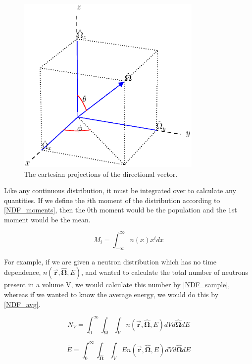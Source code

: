 \begin{figure}[h!] 
  \label{ang_relations}
  \centering
    \includegraphics[width=0.8\textwidth , trim= 0cm 2.5cm 0cm 0cm]{graphics/ang_relation.eps} %
     \caption{The cartesian projections of the directional vector.}
\end{figure}

Like any continuous distribution, it must be integrated over to calculate any quantities.  If we define the $i$th moment of the distribution according to \eqref{NDF_moments}, then the $0$th moment would be the population and the $1$st moment would be the mean.

\begin{equation}
\label{NDF_moments}
M_i = \int_{-\infty}^{\infty} n(x)  x^{i} dx
\end{equation}

For example, if we are given a neutron distribution which has no time dependence, $n(\boldsymbol{\vec{r}},\boldsymbol{\hat{\Omega}},E)$, and wanted to calculate the total number of neutrons present in a volume V, we would calculate this number by \eqref{NDF_sample}, whereas if we wanted to know the average energy, we would do this by \eqref{NDF_avg}.

\begin{equation}
\label{NDF_sample}
N_V = \int_0^\infty \int_{\boldsymbol{\hat{\Omega}}} \int_{V} n(\boldsymbol{\vec{r}},\boldsymbol{\hat{\Omega}},E) dV d\boldsymbol{\hat{\Omega}} dE
\end{equation}

\begin{equation}
\label{NDF_avg}
\bar{E} = \int_0^\infty \int_{\boldsymbol{\hat{\Omega}}} \int_{V} E n(\boldsymbol{\vec{r}},\boldsymbol{\hat{\Omega}},E) dV d\boldsymbol{\hat{\Omega}} dE
\end{equation}

